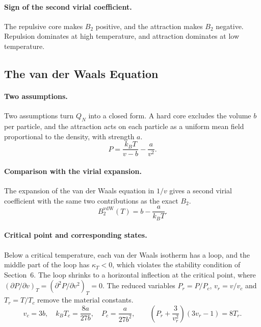 \paragraph{Sign of the second virial coefficient.}
The repulsive core makes $B_2$ positive, and the attraction makes $B_2$
negative. Repulsion dominates at high temperature, and attraction dominates
at low temperature.

\subsection{The van der Waals Equation}

\paragraph{Two assumptions.}
Two assumptions turn $Q_N$ into a closed form. A hard core excludes the
volume $b$ per particle, and the attraction acts on each particle as a
uniform mean field proportional to the density, with strength $a$.
\begin{equation}
    \boxed{P=\frac{k_BT}{v-b}-\frac{a}{v^2}.}
\end{equation}

\paragraph{Comparison with the virial expansion.}
The expansion of the van der Waals equation in $1/v$ gives a second virial
coefficient with the same two contributions as the exact $B_2$.
\begin{equation}
    \boxed{B_2^{\text{vdW}}(T)=b-\frac{a}{k_BT}.}
\end{equation}

\paragraph{Critical point and corresponding states.}
Below a critical temperature, each van der Waals isotherm has a loop, and
the middle part of the loop has $\kappa_T<0$, which violates the stability
condition of Section~6. The loop shrinks to a horizontal inflection at the
critical point, where $(\partial P/\partial v)_T=(\partial^2P/\partial
v^2)_T=0$. The reduced variables $P_r=P/P_c$, $v_r=v/v_c$ and $T_r=T/T_c$
remove the material constants.
\begin{equation}
    \boxed{v_c=3b,\quad k_BT_c=\frac{8a}{27b},\quad P_c=\frac{a}{27b^2},
    \qquad
    \left(P_r+\frac{3}{v_r^2}\right)\left(3v_r-1\right)=8T_r.}
\end{equation}

